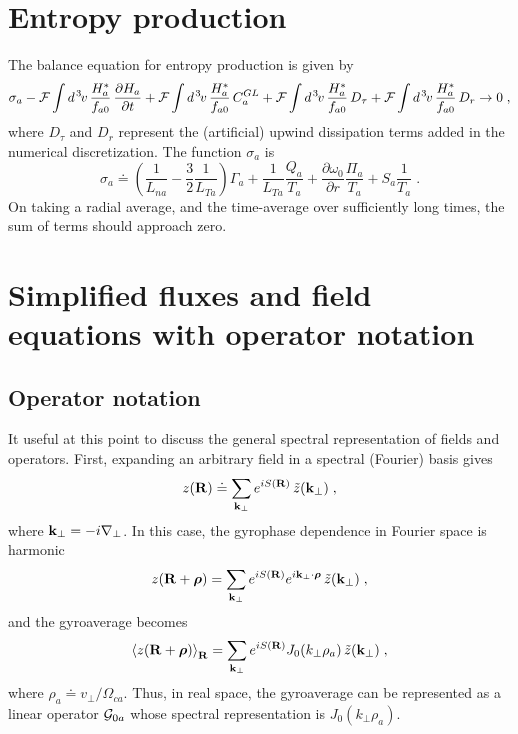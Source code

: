 \section{Entropy production}

The balance equation for entropy production is given by
%
\begin{equation}
\sigma_a 
- {\cal F} \int d^{\hskip 1pt 3} \hskip -1pt v \, \frac{H_a^*}{f_{a0}} \, \frac{\partial H_a}{\partial t}  
+ {\cal F} \int d^{\hskip 1pt 3} \hskip -1pt v \, \frac{H_a^*}{f_{a0}} \, C_a^{GL} 
+ {\cal F} \int d^{\hskip 1pt 3} \hskip -1pt v \, \frac{H_a^*}{f_{a0}} \, D_\tau  
+ {\cal F} \int d^{\hskip 1pt 3} \hskip -1pt v \, \frac{H_a^*}{f_{a0}} \, D_r \rightarrow 0 \; ,
\end{equation}
%
where $D_\tau$ and $D_r$ represent the (artificial) upwind dissipation 
terms added in the numerical discretization.  The function $\sigma_a$ 
is
%
\begin{equation}
\sigma_a \doteq
 \left( \frac{1}{L_{na}} - \frac{3}{2} \frac{1}{L_{Ta}} \right) \Gamma_a
+ \frac{1}{L_{Ta}} \frac{Q_a}{T_a} 
+ \frac{\partial\omega_0}{\partial r} \frac{\Pi_a}{T_a}  
+ S_a \frac{1}{T_a} \; .
\end{equation} 
%
On taking a radial average, and the time-average over sufficiently 
long times, the sum of terms should approach zero.

\section{Simplified fluxes and field equations with operator notation}

\subsection{Operator notation}\label{sec.opnotation}

It useful at this point to discuss the general spectral 
representation of fields and operators.  First, expanding an 
arbitrary field in a spectral (Fourier) basis gives
%
\begin{equation}
z(\mathbf{R}) \doteq \sum_{\mathbf{k}_\perp} e^{iS(\mathbf{R})} \, \tilde{z}(\mathbf{k}_\perp) \; ,
\end{equation}
%
where $\mathbf{k}_\perp = -i\nabla_\perp$.  In this case, the gyrophase dependence 
in Fourier space is harmonic
%
\begin{equation}
z(\mathbf{R}+\boldsymbol{\rho}) = \sum_{\mathbf{k}_\perp} e^{iS(\mathbf{R})} e^{i \mathbf{k}_\perp \cdot \boldsymbol{\rho}} 
  \, \tilde{z}(\mathbf{k}_\perp) \; ,
\end{equation}
% 
and the gyroaverage becomes
%
\begin{equation}
\left< z(\mathbf{R}+\boldsymbol{\rho}) \right>_{\mathbf{R}} = \sum_{\mathbf{k}_\perp} e^{iS(\mathbf{R})} J_0 (k_\perp\rho_a) \, \tilde{z}(\mathbf{k}_\perp) \; ,
\end{equation}
%
where $\rho_a \doteq v_\perp/\Omega_{ca}$.  Thus, in real space, the 
gyroaverage can be represented as a linear operator ${\cal G}_{0a}$ whose 
spectral representation is $J_0(k_\perp \rho_a)$.

